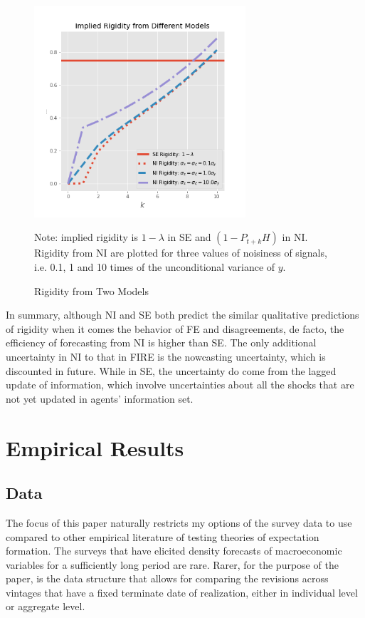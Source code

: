 \documentclass[12pt]{article}
\begin{document}
	
	\begin{figure}[ht]
		\centering
		\includegraphics[width=0.7\textwidth]{figures/rigidity.png} 
		\begin{flushleft}
			{\footnotesize Note: implied rigidity is $1-\lambda$ in SE and $(1-P_{t+k}H)$ in NI. Rigidity from NI are plotted for three values of noisiness of signals, i.e. 0.1, 1 and 10 times of the unconditional variance of $y$. }
		\end{flushleft}
		\caption{Rigidity from Two Models}
		\label{rigidity}
	\end{figure}
	
	In summary, although NI and SE both predict the similar qualitative predictions of rigidity when it comes the behavior of FE and disagreements, de facto, the efficiency of forecasting from NI is higher than SE. The only additional uncertainty in NI to that in FIRE is the nowcasting uncertainty, which is discounted in future. While in SE, the uncertainty do come from the lagged update of information, which involve uncertainties about all the shocks that are not yet updated in agents' information set. 
	
	\section{Empirical Results}\label{empirical}
	
	\subsection{Data}
	
	The focus of this paper naturally restricts my options of the survey data to use compared to other empirical literature of testing theories of expectation formation.  The surveys that have elicited density forecasts of macroeconomic variables for a sufficiently long period are rare. Rarer, for the purpose of the paper, is the data structure that allows for comparing the revisions across vintages that have a fixed terminate date of realization, either in individual level or aggregate level. 
	
\end{document}
